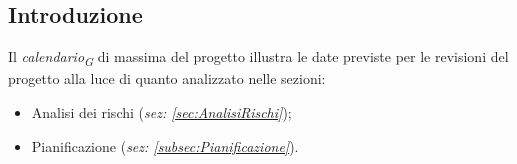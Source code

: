 \subsection{Introduzione}
Il \textit{calendario}\textsubscript{\textit{G}} di massima del progetto illustra le date previste per le revisioni del progetto
alla luce di quanto analizzato nelle sezioni: 
\begin{itemize}
    \item Analisi dei rischi (\textit{sez: \ref{sec:AnalisiRischi}});
    \item Pianificazione (\textit{sez: \ref{subsec:Pianificazione}}).
\end{itemize}